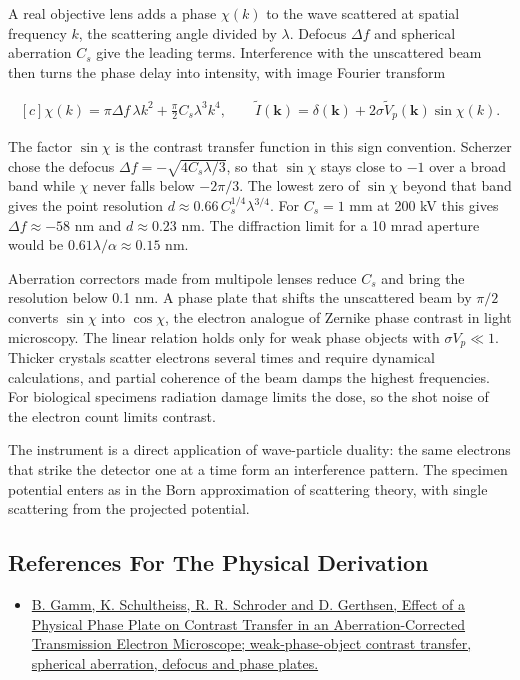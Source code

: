 \documentclass[11pt,oneside]{book}
\newenvironment{centeredalign}{\[\begin{gathered}[c]}{\end{gathered}\]}
\begin{document}
A real objective lens adds a phase \(\chi(k)\) to the wave scattered at spatial frequency \(k\), the scattering angle divided by \(\lambda\). Defocus \(\Delta f\) and spherical aberration \(C_s\) give the leading terms. Interference with the unscattered beam then turns the phase delay into intensity, with image Fourier transform

\begin{centeredalign}
\chi(k)=\pi\Delta f\,\lambda k^2+\frac{\pi}{2}C_s\lambda^3k^4,\qquad
\widetilde I(\mathbf k)=\delta(\mathbf k)+2\sigma\widetilde V_p(\mathbf k)\sin\chi(k).
\end{centeredalign}

The factor \(\sin\chi\) is the contrast transfer function in this sign convention. Scherzer chose the defocus \(\Delta f=-\sqrt{4C_s\lambda/3}\), so that \(\sin\chi\) stays close to \(-1\) over a broad band while \(\chi\) never falls below \(-2\pi/3\). The lowest zero of \(\sin\chi\) beyond that band gives the point resolution \(d\approx0.66\,C_s^{1/4}\lambda^{3/4}\). For \(C_s=1\) mm at 200 kV this gives \(\Delta f\approx-58\) nm and \(d\approx0.23\) nm. The diffraction limit for a 10 mrad aperture would be \(0.61\lambda/\alpha\approx0.15\) nm.

Aberration correctors made from multipole lenses reduce \(C_s\) and bring the resolution below 0.1 nm. A phase plate that shifts the unscattered beam by \(\pi/2\) converts \(\sin\chi\) into \(\cos\chi\), the electron analogue of Zernike phase contrast in light microscopy. The linear relation holds only for weak phase objects with \(\sigma V_p\ll1\). Thicker crystals scatter electrons several times and require dynamical calculations, and partial coherence of the beam damps the highest frequencies. For biological specimens radiation damage limits the dose, so the shot noise of the electron count limits contrast.

The instrument is a direct application of wave-particle duality: the same electrons that strike the detector one at a time form an interference pattern. The specimen potential enters as in the Born approximation of scattering theory, with single scattering from the projected potential.

\subsection*{References For The Physical Derivation}
\begin{itemize}
\item \href{https://arxiv.org/abs/1009.4038}{B. Gamm, K. Schultheiss, R. R. Schroder and D. Gerthsen, Effect of a Physical Phase Plate on Contrast Transfer in an Aberration-Corrected Transmission Electron Microscope; weak-phase-object contrast transfer, spherical aberration, defocus and phase plates.}
\end{itemize}
\end{document}
